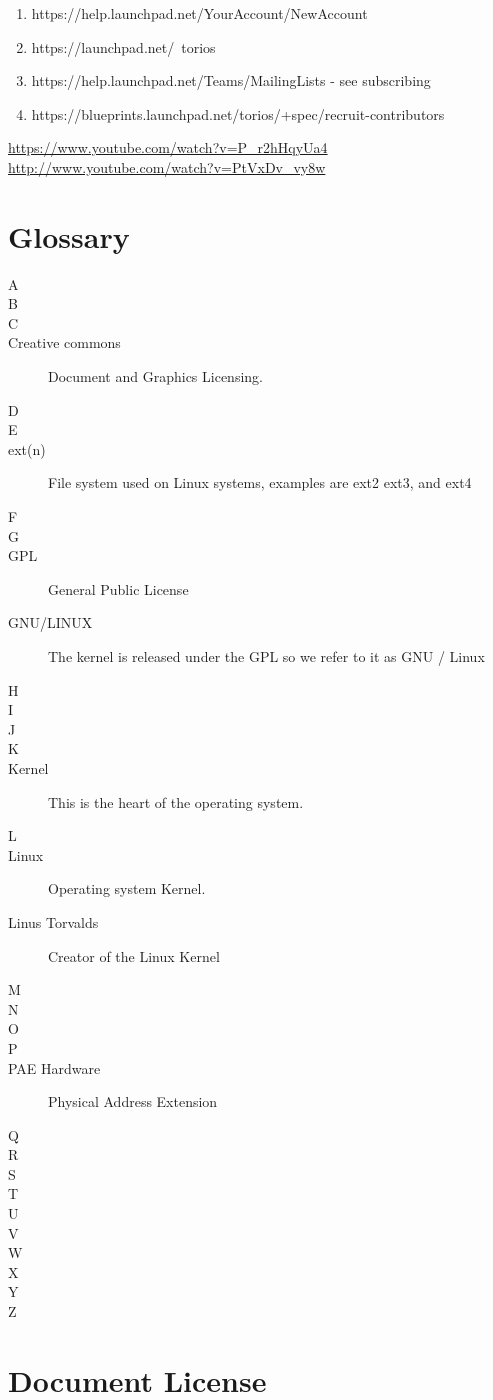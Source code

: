 \documentclass[12pt,a4paper]{book}
\begin{document}
\begin{enumerate}
\item {https://help.launchpad.net/YourAccount/NewAccount}
\item {https://launchpad.net/~torios}
\item {https://help.launchpad.net/Teams/MailingLists - see subscribing}
\item {https://blueprints.launchpad.net/torios/+spec/recruit-contributors}

\end{enumerate}

\url{https://www.youtube.com/watch?v=P_r2hHqyUa4}
\url{http://www.youtube.com/watch?v=PtVxDv_vy8w}

\chapter{Glossary}
\begin{multicols}{2}


\begin{description}
\item[A]
\item[B]
\item[C]
\item[Creative commons] Document and Graphics Licensing.
\item[D]
\item[E]
\item[ext(n)] File system used on Linux systems, examples are ext2 ext3, and ext4 
\item[F]
\item[G]
\item[GPL] General Public License 
\item[GNU/LINUX] The kernel is released under the GPL so we refer to it as GNU / Linux
\item[H]
\item[I]
\item[J]
\item[K]
\item[Kernel] This is the heart of the operating system.
\columnbreak
\item[L]
\item[Linux] Operating system Kernel. 
\item[Linus Torvalds] Creator of the Linux Kernel
\item[M]
\item[N]
\item[O]
\item[P]
\item[PAE Hardware] Physical Address Extension 
\item[Q]
\item[R]
\item[S]
\item[T]
\item[U]
\item[V]
\item[W]
\item[X]
\item[Y]
\item[Z]
\end{description}
\end{multicols}
\chapter{Document License}

\end{document}
